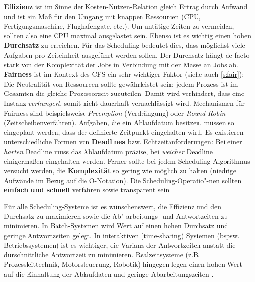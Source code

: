\textbf{Effizienz} ist im Sinne der Kosten-Nutzen-Relation gleich Ertrag durch Aufwand und ist ein Maß für den Umgang mit knappen Ressourcen (CPU, Fertigungsmaschine, Flughafengate, etc.). Um untätige Zeiten zu vermeiden, sollten also eine CPU maximal ausgelastet sein. Ebenso ist es wichtig einen hohen \textbf{Durchsatz} zu erreichen. Für das Scheduling bedeutet dies, dass möglichst viele Aufgaben pro Zeiteinheit ausgeführt werden sollen. Der Durchsatz hängt de facto stark von der Komplexität der Jobs in Verbindung mit der Masse an Jobs ab. \textbf{Fairness} ist im Kontext des CFS ein sehr wichtiger Faktor (siehe auch \ref{s:fair}): Die Neutralität von Ressourcen sollte gewährleistet sein; jedem Prozess ist im Gesamten die gleiche Prozessorzeit zuzuteilen. Damit wird verhindert, dass eine Instanz \textit{verhungert}, somit nicht dauerhaft vernachlässigt wird. Mechanismen für Fairness sind beispielsweise \textit{Preemption} (Verdrängung) oder \textit{Round Robin} (Zeitscheibenverfahren). 
Aufgaben, die ein Ablaufdatum besitzen, müssen so eingeplant werden, dass der definierte Zeitpunkt eingehalten wird. Es existieren unterschiedliche Formen von \textbf{Deadlines} bzw. Echtzeitanforderungen: Bei einer \textit{harten} Deadline muss das Ablaufdatum präzise, bei \textit{weicher} Deadline einigermaßen eingehalten werden. Ferner sollte bei jedem Scheduling-Algorithmus versucht werden, die \textbf{Komplexität} so gering wie möglich zu halten (niedrige Aufwände im Bezug auf die O-Notation). Die Scheduling-Operatio"-nen sollten \textbf{einfach und schnell} verfahren sowie transparent sein.  

Für alle Scheduling-Systeme ist es wünschenswert, die Effizienz und den Durchsatz zu maximieren sowie  die Ab"-arbeitungs- und Antwortzeiten zu minimieren. In Batch-Systemen wird Wert auf einen hohen Durchsatz und geringe Antwortzeiten gelegt. In interaktiven (time-sharing) Systemen (bspsw. Betriebssystemen) ist es wichtiger, die Varianz der Antwortzeiten anstatt die durschnittliche Antwortzeit zu minimieren. Realzeitsysteme (z.B. Prozessleittechnik, Motorsteuerung, Robotik) hingegen legen einen hohen Wert auf die Einhaltung der Ablaufdaten und geringe Abarbeitungszeiten \cite{asilberschatz}.\\



